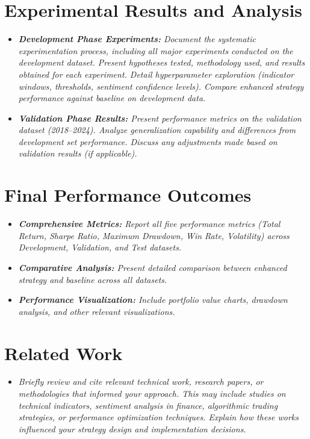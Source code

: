 \documentclass[11pt,twoside,a4paper]{article}
\begin{document}
\section{Experimental Results and Analysis}
\begin{itemize}
    \item \emph{\textbf{Development Phase Experiments:} Document the systematic experimentation process, including all major experiments conducted on the development dataset. Present hypotheses tested, methodology used, and results obtained for each experiment. Detail hyperparameter exploration (indicator windows, thresholds, sentiment confidence levels). Compare enhanced strategy performance against baseline on development data.}
    \item \emph{\textbf{Validation Phase Results:} Present performance metrics on the validation dataset (2018–2024). Analyze generalization capability and differences from development set performance. Discuss any adjustments made based on validation results (if applicable).}
\end{itemize}

\section{Final Performance Outcomes}
\begin{itemize}
    \item \emph{\textbf{Comprehensive Metrics:} Report all five performance metrics (Total Return, Sharpe Ratio, Maximum Drawdown, Win Rate, Volatility) across Development, Validation, and Test datasets.}
    \item \emph{\textbf{Comparative Analysis:} Present detailed comparison between enhanced strategy and baseline across all datasets.}
    \item \emph{\textbf{Performance Visualization:} Include portfolio value charts, drawdown analysis, and other relevant visualizations.}
\end{itemize}

\section{Related Work}
\begin{itemize}
    \item \emph{Briefly review and cite relevant technical work, research papers, or methodologies that informed your approach. This may include studies on technical indicators, sentiment analysis in finance, algorithmic trading strategies, or performance optimization techniques. Explain how these works influenced your strategy design and implementation decisions.}
\end{itemize}
\end{document}
